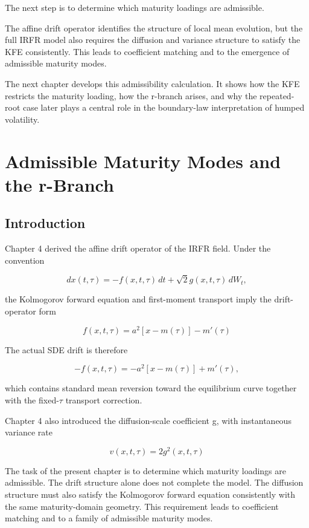 \documentclass[11pt,oneside]{book}
\begin{document}
The next step is to determine which maturity loadings are admissible.

The affine drift operator identifies the structure of local mean
evolution, but the full IRFR model also requires the diffusion and
variance structure to satisfy the KFE consistently. This leads to
coefficient matching and to the emergence of admissible maturity modes.

The next chapter develops this admissibility calculation. It shows how
the KFE restricts the maturity loading, how the r-branch arises, and why
the repeated-root case later plays a central role in the boundary-law
interpretation of humped volatility.

\chapter{Admissible Maturity Modes and the r-Branch}\label{chapter-5}

\section{Introduction}

Chapter 4 derived the affine drift operator of the IRFR field. Under the
convention

\[
dx(t,\tau) = -f(x,t,\tau)\,dt + \sqrt{2} g(x,t,\tau)\,dW_t,
\]

the Kolmogorov forward equation and first-moment transport imply the
drift-operator form

\[
f(x,t,\tau) = a^2[x - m(\tau)] - m'(\tau)
\]

The actual SDE drift is therefore

\[
-f(x,t,\tau) = -a^2[x - m(\tau)] + m'(\tau),
\]

which contains standard mean reversion toward the equilibrium curve
together with the fixed-$\tau$ transport correction.

Chapter 4 also introduced the diffusion-scale coefficient g, with
instantaneous variance rate

\[
v(x,t,\tau) = 2g^2(x,t,\tau)
\]

The task of the present chapter is to determine which maturity loadings
are admissible. The drift structure alone does not complete the model.
The diffusion structure must also satisfy the Kolmogorov forward
equation consistently with the same maturity-domain geometry. This
requirement leads to coefficient matching and to a family of admissible
maturity modes.
\end{document}
